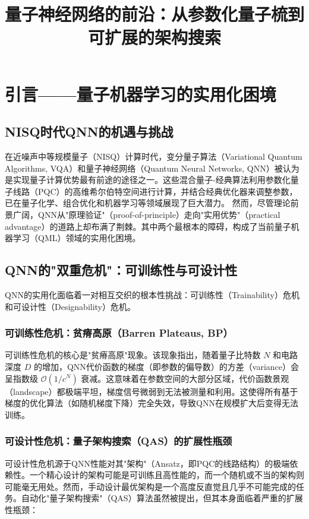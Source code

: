 \documentclass[12pt,a4paper]{article}
\title{量子神经网络的前沿：从参数化量子梳到可扩展的架构搜索}
\author{}
\date{}
\begin{document}
\maketitle

\section{引言——量子机器学习的实用化困境}

\subsection{NISQ时代QNN的机遇与挑战}


在近噪声中等规模量子（NISQ）计算时代，变分量子算法（Variational Quantum Algorithms, VQA）\cite{ref1}和量子神经网络（Quantum Neural Networks, QNN）被认为是实现量子计算优势最有前途的途径之一\cite{ref3}。这些混合量子-经典算法利用参数化量子线路（PQC）的高维希尔伯特空间进行计算，并结合经典优化器来调整参数，已在量子化学、组合优化和机器学习等领域展现了巨大潜力\cite{ref5}。
然而，尽管理论前景广阔，QNN从"原理验证"（proof-of-principle）走向"实用优势"（practical advantage）的道路上却布满了荆棘。其中两个最根本的障碍，构成了当前量子机器学习（QML）领域的实用化困境。

\subsection{QNN的"双重危机"：可训练性与可设计性}

QNN的实用化面临着一对相互交织的根本性挑战：可训练性（Trainability）危机和可设计性（Designability）危机。

\subsubsection{可训练性危机：贫瘠高原（Barren Plateaus, BP）}
可训练性危机的核心是"贫瘠高原"现象\cite{ref4}。该现象指出，随着量子比特数 $N$ 和电路深度 $D$ 的增加，QNN代价函数的梯度（即参数的偏导数）的方差（variance）会呈指数级 $\mathcal{O}(1/c^N)$ 衰减\cite{ref8}。这意味着在参数空间的大部分区域，代价函数景观（landscape）都极端平坦，梯度信号微弱到无法被测量和利用。这使得所有基于梯度的优化算法（如随机梯度下降）完全失效，导致QNN在规模扩大后变得无法训练。

\subsubsection{可设计性危机：量子架构搜索（QAS）的扩展性瓶颈}
可设计性危机源于QNN性能对其"架构"（Ansatz，即PQC的线路结构）的极端依赖性\cite{ref10}。一个精心设计的架构可能是可训练且高性能的，而一个随机或不当的架构则可能毫无用处。然而，手动设计最优架构是一个高度反直觉且几乎不可能完成的任务。自动化"量子架构搜索"（QAS）算法虽然被提出，但其本身面临着严重的扩展性瓶颈：
\end{document}
